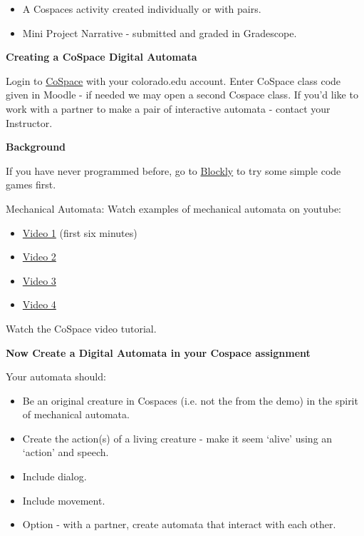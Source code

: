 \begin{itemize}
    \item A Cospaces activity created individually or with pairs.
    \item Mini Project Narrative - submitted and graded in Gradescope.
\end{itemize}

\textbf{Creating a CoSpace Digital Automata} \vspace*{1em}

Login to \href{https://cospaces.io/edu/}{CoSpace} with your colorado.edu account. Enter CoSpace class code given in Moodle - if needed we may open a second Cospace class. If you’d like to work with a partner 
to make a pair of interactive automata - contact your Instructor. \vspace*{1em}

\textbf{Background} \vspace*{1em}

If you have never programmed before, go to \href{https://blockly.games/}{Blockly} to try some simple code games first. \vspace*{1em}

Mechanical Automata: Watch examples of mechanical automata on youtube:

\begin{itemize}
    \item \href{https://www.youtube.com/watch?v=YAg66jrvpHA}{Video 1} (first six minutes)
    \item \href{https://www.youtube.com/watch?v=DgIDStgaybc}{Video 2}
    \item \href{https://www.youtube.com/watch?v=L3Die7PfKvo}{Video 3}
    \item \href{https://www.youtube.com/watch?v=-OJ1Yc2SwAs}{Video 4}
\end{itemize} 

Watch the CoSpace video tutorial. \vspace*{1em}

\textbf{Now Create a Digital Automata in your Cospace assignment} \vspace*{1em}

Your automata should:

\begin{itemize}
    \item Be an original creature in Cospaces (i.e. not the from the demo) in the spirit of mechanical automata.
    \item Create the action(s) of a living creature - make it seem ‘alive’ using an ‘action’ and speech.
    \item Include dialog.
    \item Include movement.
    \item Option - with a partner, create automata that interact with each other.
\end{itemize}

